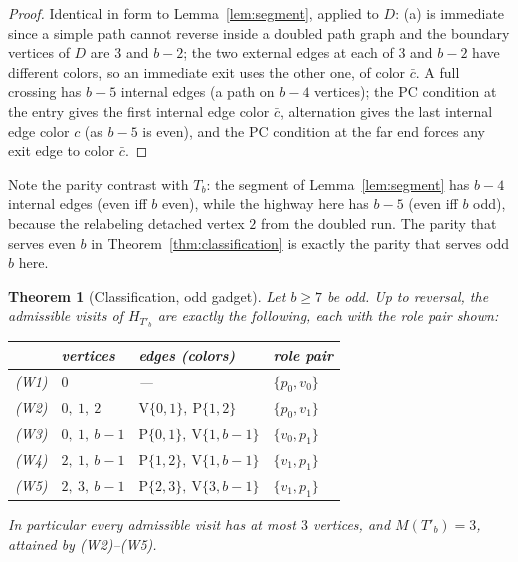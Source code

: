 \documentclass[11pt]{article}
\newtheorem{theorem}{Theorem}[section]
\theoremstyle{definition}
\begin{document}
\begin{proof}
Identical in form to Lemma~\ref{lem:segment}, applied to $D$: (a) is immediate since a
simple path cannot reverse inside a doubled path graph and the boundary vertices of
$D$ are $3$ and $b-2$; the two external edges at each of $3$ and $b-2$ have different
colors, so an immediate exit uses the other one, of color $\bar c$. A full crossing
has $b-5$ internal edges (a path on $b-4$ vertices); the PC condition at the entry
gives the first internal edge color $\bar c$, alternation gives the last internal edge
color $c$ (as $b-5$ is even), and the PC condition at the far end forces any exit edge
to color $\bar c$.
\end{proof}

Note the parity contrast with $T_b$: the segment of Lemma~\ref{lem:segment} has $b-4$
internal edges (even iff $b$ even), while the highway here has $b-5$ (even iff $b$
odd), because the relabeling detached vertex $2$ from the doubled run. The parity that
serves even $b$ in Theorem~\ref{thm:classification} is exactly the parity that serves
odd $b$ here.

\begin{theorem}[Classification, odd gadget]\label{thm:oddb-classification}
Let $b \ge 7$ be odd. Up to reversal, the admissible visits of $H_{T'_b}$ are exactly
the following, each with the role pair shown:
\begin{center}
\begin{tabular}{clll}
\toprule
 & vertices & edges (colors) & role pair \\
\midrule
(W1) & $0$ & --- & $\{p_0, v_0\}$ \\
(W2) & $0,\ 1,\ 2$ & $\mathrm V\{0,1\},\ \mathrm P\{1,2\}$ & $\{p_0, v_1\}$ \\
(W3) & $0,\ 1,\ b-1$ & $\mathrm P\{0,1\},\ \mathrm V\{1,b{-}1\}$ & $\{v_0, p_1\}$ \\
(W4) & $2,\ 1,\ b-1$ & $\mathrm P\{1,2\},\ \mathrm V\{1,b{-}1\}$ & $\{v_1, p_1\}$ \\
(W5) & $2,\ 3,\ b-1$ & $\mathrm P\{2,3\},\ \mathrm V\{3,b{-}1\}$ & $\{v_1, p_1\}$ \\
\bottomrule
\end{tabular}
\end{center}
In particular every admissible visit has at most $3$ vertices, and $M(T'_b) = 3$,
attained by (W2)--(W5).
\end{theorem}
\end{document}

